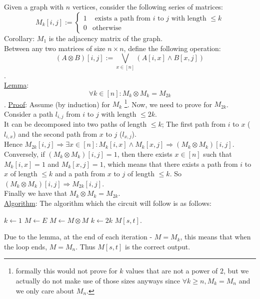 \subsection{}
Given a graph with $n$ vertices, 
consider the following series of matrices:\\
\[
	M_k[i,j]:=
	\begin{cases}
		1 & \text{ exists a path from } i \text{ to } j \text{ with length } \leq k\\
		0 & \text{otherwise}
	\end{cases}
\]
Corollary: $M_1$ is the adjacency matrix of the graph.\\
Between any two matrices of size $n\times n$, define the following operation:
\[(A\otimes B)[i,j]:=\bigvee_{x\in [n]}\left(A[i, x]\wedge B[x, j]\right)\].\\

\underline{Lemma}:
\[\forall k\in[n]: M_k\otimes M_k=M_{2k}\].
\underline{Proof}:
Assume (by induction) for $M_k$
\footnote{formally this would not prove for
$k$ values that are not a power of $2$,
but we actually do not make use of those sizes anyways
since $\forall k\geq n, M_k=M_n$ and we only care about $M_n$.}.
Now, we need to prove for $M_{2k}$. Consider a path $l_{i,j}$
from $i$ to $j$ with length $\leq 2k$.\\
It can be decomposed into two paths of length $\leq k$;
The first path from $i$ to $x$ ($l_{i,x}$) and the second path from $x$ to $j$ ($l_{x,j}$).\\
Hence $M_{2k}[i,j]\Rightarrow \exists x\in[n]: M_k[i,x]\wedge M_k[x,j]\Rightarrow (M_k\otimes M_k)[i,j]$.\\
Conversely, if $(M_k\otimes M_k)[i,j]=1$, then there exists $x\in[n]$ such that $M_k[i,x]=1$ and $M_k[x,j]=1$,
which means that there exists a path from $i$ to $x$ of length $\leq k$ and a path from $x$ to $j$ of length $\leq k$.
So $(M_k\otimes M_k)[i,j]\Rightarrow M_{2k}[i,j]$.\\
Finally we have that $M_{k}\otimes M_{k}=M_{2k}$.\\
\newpage 
\underline{Algorithm}:
The algorithm which the circuit will follow is as follows:\\
\begin{algorithmic}
	\State $k\leftarrow 1$
	\State $M\leftarrow E$
		\State $M\leftarrow M\otimes M$
		\State $k\leftarrow 2k$
	\EndWhile
	\State \Return $M[s,t]$.
\end{algorithmic}

Due to the lemma, at the end of each iteration - $M=M_k$,
this means that when the loop ends, $M=M_n$.
Thus $M[s,t]$ is the correct output.\\

